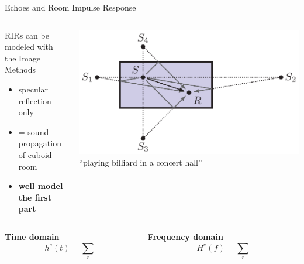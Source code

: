 \begin{frame}{Echoes and Room Impulse Response}

    \begin{columns}[onlytextwidth]
        \begin{column}{0.60\textwidth}
            \begin{block}{RIRs can be modeled with the Image Methods}
                \begin{itemize}
                    \item specular reflection only
                    \item = sound propagation of cuboid room
                    \item \textbf{well model the first part}
                \end{itemize}
            \end{block}
        \end{column}
        \begin{column}{0.38\textwidth}
            \centering
            \includegraphics[width=\textwidth]{figures/ism.png}
            {\small ``playing billiard in a concert hall''}
        \end{column}
    \end{columns}

    \vfill
    \begin{columns}[onlytextwidth]
        \begin{column}{0.48\textwidth}
            \centering
            \textbf{Time domain}
            \begin{equation*}
                h^e(t) = \sum_r
            \end{equation*}
        \end{column}
        \begin{column}{0.48\textwidth}
            \centering
            \textbf{Frequency domain}
            \begin{equation*}
                H^e(f) = \sum_r
            \end{equation*}
        \end{column}
    \end{columns}


\end{frame}
